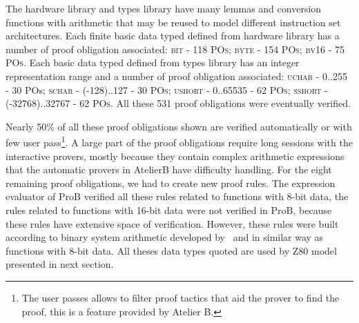 \documentclass[a4paper]{llncs}
\begin{document}
%

The hardware library and types library have many lemmas and conversion functions with arithmetic that may be reused to model different instruction set architectures. Each finite basic data typed defined from hardware library has a number of proof obligation associated: \textsc{bit} - 118 {\small \textsc{POs}}; \textsc{byte} - 154 {\small \textsc{POs}}; \textsc{bv16} - 75 {\small \textsc{POs}}. Each basic data typed defined from types library has an integer representation range and a number of proof obligation associated: \textsc{uchar} - 0..255 -  30 {POs}; \textsc{schar} - (-128)..127 - 30 {\small \textsc{POs}}; \textsc{ushort} - 0..65535 - 62 {\small \textsc{POs}}; \textsc{sshort} - (-32768)..32767 - 62 {\small \textsc{POs}}. All these 531 proof obligations were eventually verified. 


Nearly 50\% of all these proof obligations shown are verified automatically or with few user pass\footnote{The user passes allows to filter proof tactics that aid the prover to find the proof, this is a feature provided by Atelier B.}. A large part of the proof obligations require long sessions with the interactive provers, mostly because they contain complex arithmetic expressions that the automatic provers in AtelierB have difficulty handling. 
For the eight remaining proof obligations, we  had to create new proof rules. The expression evaluator of ProB verified all these rules related to functions with 8-bit data, the rules related to functions with 16-bit data were not verified in ProB, because these rules have extensive space of verification. However, these rules were built according to binary system arithmetic developed by~\cite{Leibnizens} and in similar way as functions with 8-bit data.  All theses data types quoted are used by Z80 model presented in next section.
\end{document}
